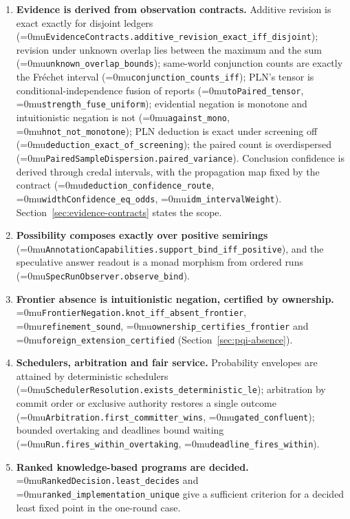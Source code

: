\documentclass[11pt]{article}
\newcommand{\leanname}[1]{\textup{\Urlmuskip=0mu\relax\nolinkurl{#1}}}
\theoremstyle{definition}
\theoremstyle{remark}
\begin{document}
\begin{enumerate}
  knowledge, evidence derivation, and the cells listed in the next items.
\item \textbf{Evidence is derived from observation contracts.}  Additive
  revision is exact exactly for disjoint ledgers
  (\leanname{EvidenceContracts.additive_revision_exact_iff_disjoint}); revision
  under unknown overlap lies between the maximum and the sum
  (\leanname{unknown_overlap_bounds}); same-world conjunction counts are
  exactly the Fréchet interval (\leanname{conjunction_counts_iff}); PLN's
  tensor is conditional-independence fusion of reports
  (\leanname{toPaired_tensor}, \leanname{strength_fuse_uniform}); evidential
  negation is monotone and intuitionistic negation is not
  (\leanname{against_mono}, \leanname{hnot_not_monotone}); PLN deduction is
  exact under screening off (\leanname{deduction_exact_of_screening}); the
  paired count is overdispersed (\leanname{PairedSampleDispersion.paired_variance}).
  Conclusion confidence is derived through credal intervals, with the
  propagation map fixed by the contract
  (\leanname{deduction_confidence_route}, \leanname{widthConfidence_eq_odds},
  \leanname{idm_intervalWeight}).
  Section~\ref{sec:evidence-contracts} states the scope.
\item \textbf{Possibility composes exactly over positive semirings}
  (\leanname{AnnotationCapabilities.support_bind_iff_positive}), and the
  speculative answer readout is a monad morphism from ordered runs
  (\leanname{SpecRunObserver.observe_bind}).
\item \textbf{Frontier absence is intuitionistic negation, certified by
  ownership.}  \leanname{FrontierNegation.knot_iff_absent_frontier},
  \leanname{refinement_sound}, \leanname{ownership_certifies_frontier} and
  \leanname{foreign_extension_certified} (Section~\ref{sec:pqi-absence}).
\item \textbf{Schedulers, arbitration and fair service.}  Probability envelopes
  are attained by deterministic schedulers
  (\leanname{SchedulerResolution.exists_deterministic_le}); arbitration by
  commit order or exclusive authority restores a single outcome
  (\leanname{Arbitration.first_committer_wins}, \leanname{gated_confluent});
  bounded overtaking and deadlines bound waiting
  (\leanname{Run.fires_within_overtaking}, \leanname{deadline_fires_within}).
\item \textbf{Ranked knowledge-based programs are decided.}
  \leanname{RankedDecision.least_decides} and
  \leanname{ranked_implementation_unique} give a sufficient criterion for a
  decided least fixed point in the one-round case.
\end{enumerate}
\end{document}
